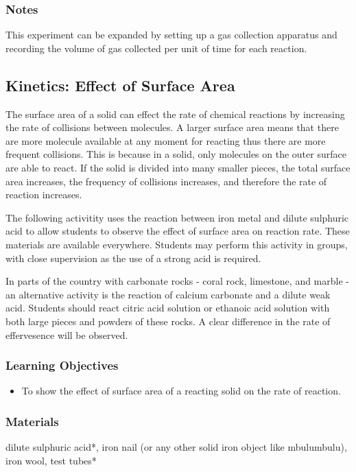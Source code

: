 \subsubsection*{Notes}
This experiment can be expanded by setting up a gas collection apparatus and recording the volume of gas collected per unit of time for each reaction.

\subsection{Kinetics: Effect of Surface Area}

The surface area of a solid can effect the rate of chemical reactions by increasing the rate of collisions between molecules. A larger surface area means that there are more molecule available at any moment for reacting thus there are more frequent collisions. This is because in a solid, only molecules on the outer surface are able to react. If the solid is divided into many smaller pieces, the total surface area increases, the frequency of collisions increases, and therefore the rate of reaction increases.

The following activitity uses the reaction between iron metal and dilute sulphuric acid to allow students to observe the effect of surface area on reaction rate. These materials are available everywhere. Students may perform this activity in groups, with close supervision as the use of a strong acid is required.

In parts of the country with carbonate rocks - coral rock, limestone, and marble - an alternative activity is the reaction of calcium carbonate and a dilute weak acid. Students should react citric acid solution or ethanoic acid solution with both large pieces and powders of these rocks. A clear difference in the rate of effervesence will be observed.

\subsubsection*{Learning Objectives}
\begin{itemize}
\item{To show the effect of surface area of a reacting solid on the rate of reaction.}
\end{itemize}

\subsubsection*{Materials}
dilute sulphuric acid*, iron nail (or any other solid iron object like mbulumbulu), iron wool, test tubes*

